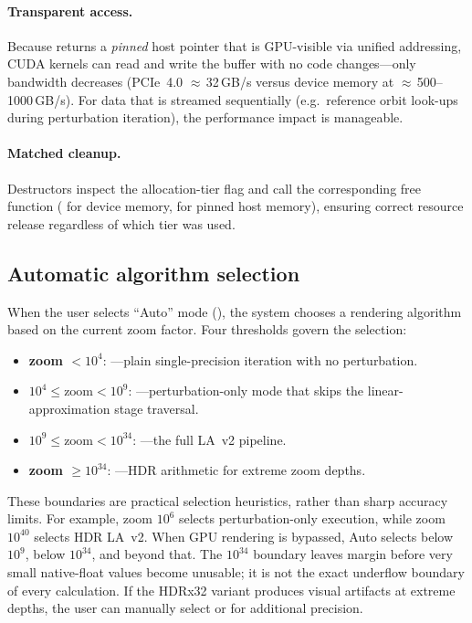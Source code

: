 \paragraph{Transparent access.}
Because  returns a \emph{pinned} host pointer
that is GPU-visible via unified addressing, CUDA kernels can read
and write the buffer with no code changes---only bandwidth
decreases (PCIe~4.0 $\approx$\,32\,GB/s versus device memory at
$\approx$\,500--1000\,GB/s).  For data that is streamed
sequentially (e.g.\ reference orbit look-ups during perturbation
iteration), the performance impact is manageable.

\paragraph{Matched cleanup.}
Destructors inspect the allocation-tier flag and call the
corresponding free function ( for device memory,
 for pinned host memory), ensuring correct
resource release regardless of which tier was used.

\subsection{Automatic algorithm selection}
\label{subsec:auto-algorithm}

When the user selects ``Auto'' mode
(), the system chooses a rendering
algorithm based on the current zoom factor.  Four thresholds govern the
selection:
\begin{itemize}
  \item \textbf{zoom $< 10^{4}$}: ---plain
        single-precision iteration with no perturbation.
  \item \textbf{$10^{4} \le \text{zoom} < 10^{9}$}:
        ---perturbation-only mode that
        skips the linear-approximation stage traversal.
  \item \textbf{$10^{9} \le \text{zoom} < 10^{34}$}:
        ---the full LA~v2 pipeline.
  \item \textbf{zoom $\ge 10^{34}$}:
        ---HDR arithmetic for extreme
        zoom depths.
\end{itemize}
These boundaries are practical selection heuristics, rather than sharp accuracy
limits. For example, zoom $10^6$ selects perturbation-only execution, while zoom
$10^{40}$ selects HDR LA~v2. When GPU rendering is bypassed, Auto selects
 below $10^9$,  below $10^{34}$, and
 beyond that. The $10^{34}$ boundary leaves margin
before very small native-float values become unusable; it is not the exact
underflow boundary of every calculation.  If the HDRx32 variant produces
visual artifacts at extreme depths, the user can manually select
 or  for additional precision.

